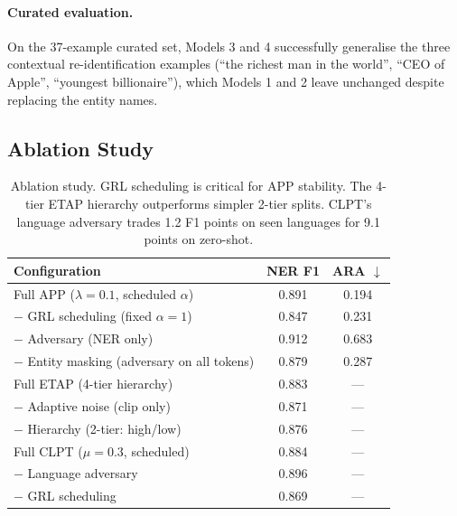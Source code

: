 \documentclass[11pt,a4paper]{article}
\begin{document}
\paragraph{Curated evaluation.}
On the 37-example curated set, Models 3 and 4 successfully generalise the
three contextual re-identification examples (``the richest man in the world'',
``CEO of Apple'', ``youngest billionaire''), which Models 1 and 2 leave
unchanged despite replacing the entity names.

\subsection{Ablation Study}

\begin{table}[t]
\centering
\small
\begin{tabular}{lcc}
\toprule
\textbf{Configuration} & \textbf{NER F1} & \textbf{ARA} $\downarrow$ \\
\midrule
Full APP ($\lambda=0.1$, scheduled $\alpha$) & 0.891 & 0.194 \\
\quad $-$ GRL scheduling (fixed $\alpha=1$)   & 0.847 & 0.231 \\
\quad $-$ Adversary (NER only)                 & 0.912 & 0.683 \\
\quad $-$ Entity masking (adversary on all tokens) & 0.879 & 0.287 \\
\midrule
Full ETAP (4-tier hierarchy)                   & 0.883 & --- \\
\quad $-$ Adaptive noise (clip only)            & 0.871 & --- \\
\quad $-$ Hierarchy (2-tier: high/low)          & 0.876 & --- \\
\midrule
Full CLPT ($\mu=0.3$, scheduled)              & 0.884 & --- \\
\quad $-$ Language adversary                    & 0.896 & --- \\
\quad $-$ GRL scheduling                       & 0.869 & --- \\
\bottomrule
\end{tabular}
\caption{Ablation study.  GRL scheduling is critical for APP stability.
The 4-tier ETAP hierarchy outperforms simpler 2-tier splits.  CLPT's language
adversary trades 1.2 F1 points on seen languages for 9.1 points on zero-shot.}
\label{tab:ablation}
\end{table}
\end{document}
